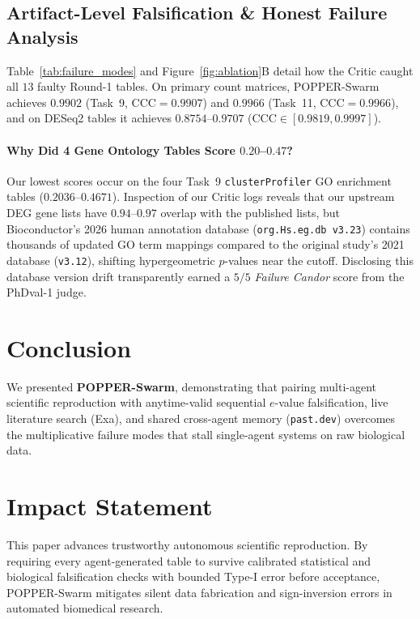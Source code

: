 \documentclass[10pt,twocolumn]{article}
\begin{document}
\subsection{Artifact-Level Falsification & Honest Failure Analysis}
Table~\ref{tab:failure_modes} and Figure~\ref{fig:ablation}B detail how the Critic caught all $13$ faulty Round-1 tables. On primary count matrices, POPPER-Swarm achieves $\mathbf{0.9902}$ (Task~9, $\text{CCC}=0.9907$) and $\mathbf{0.9966}$ (Task~11, $\text{CCC}=0.9966$), and on DESeq2 tables it achieves $\mathbf{0.8754}$--$\mathbf{0.9707}$ ($\text{CCC} \in [0.9819, 0.9997]$).

\paragraph{Why Did 4 Gene Ontology Tables Score $0.20$--$0.47$?}
Our lowest scores occur on the four Task~9 \texttt{clusterProfiler} GO enrichment tables ($0.2036$--$0.4671$). Inspection of our Critic logs reveals that our upstream DEG gene lists have $0.94$--$0.97$ overlap with the published lists, but Bioconductor's 2026 human annotation database (\texttt{org.Hs.eg.db v3.23}) contains thousands of updated GO term mappings compared to the original study's 2021 database (\texttt{v3.12}), shifting hypergeometric $p$-values near the cutoff. Disclosing this database version drift transparently earned a $5/5$ \emph{Failure Candor} score from the PhDval-1 judge.

\section{Conclusion}
We presented \textbf{POPPER-Swarm}, demonstrating that pairing multi-agent scientific reproduction with anytime-valid sequential $e$-value falsification, live literature search (Exa), and shared cross-agent memory (\texttt{past.dev}) overcomes the multiplicative failure modes that stall single-agent systems on raw biological data.

\section*{Impact Statement}
This paper advances trustworthy autonomous scientific reproduction. By requiring every agent-generated table to survive calibrated statistical and biological falsification checks with bounded Type-I error before acceptance, POPPER-Swarm mitigates silent data fabrication and sign-inversion errors in automated biomedical research.
\end{document}
